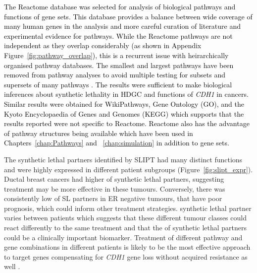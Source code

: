 \textcolor{black}{
The Reactome \citep{Reactome} database was selected for analysis of biological pathways and functions of gene sets. This database provides a balance between wide coverage of many \textcolor{black}{human} genes in the analysis and more careful curation of literature and experimental evidence for pathways. While the Reactome pathways are not independent as they overlap considerably (as shown in Appendix Figure~\ref{fig:pathway_overlap}), this is a recurrent issue with heirarchically organised pathway databases. The smallest and largest pathways have been removed from pathway analyses to avoid multiple testing for subsets and supersets of many pathways \citep[as performed by others such as][]{genesetdb}. The results were sufficient to make biological inferences about synthetic lethality in \gls{HDGC} and functions of \textit{CDH1} in cancers. Similar results were obtained for WikiPathways, Gene Ontology (GO), and the Kyoto Encyclopaedia of Genes and Genomes (KEGG) which supports that the results reported were not specific to Reactome. Reactome also has the advantage of pathway structures being available which have been used in Chapters~\ref{chap:Pathways} and ~\ref{chap:simulation} in addition to gene sets.
}

The \gls{synthetic lethal} partners identified by \gls{SLIPT} had many distinct functions and were highly expressed in different patient subgroups (Figure~\ref{fig:slipt_expr}). %
Ductal breast cancers had higher  of \gls{synthetic lethal} partners, suggesting treatment may be more effective in these tumours.  Conversely, there was consistently low  of SL partners in \gls{ER} negative tumours, that have poor prognosis, which could inform other treatment strategies. %
\Gls{synthetic lethal} partner  varies between patients which suggests that these different tumour classes could react differently to the same treatment and that the  of synthetic lethal partners could be a clinically important biomarker. Treatment of different \gls{pathway} and gene combinations in different patients is likely to be the most effective approach to target genes compensating for \textit{CDH1} gene loss without acquired resistance as well \citep{Lord2014}. 

